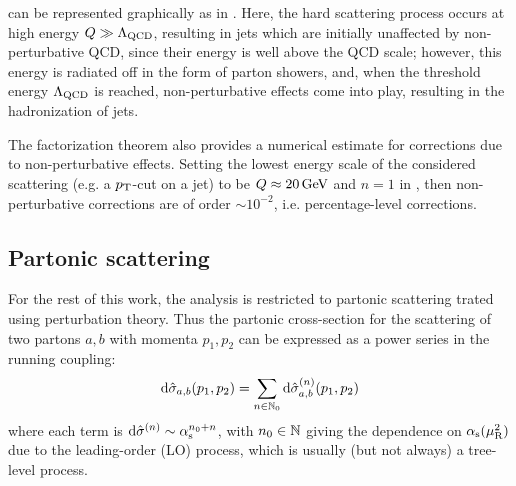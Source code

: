  can be represented graphically as in . Here, the hard scattering process occurs at high energy $ Q \gg \Lambda_\text{QCD} $, resulting in jets which are initially unaffected by non-perturbative QCD, since their energy is well above the QCD scale; however, this energy is radiated off in the form of parton showers, and, when the threshold energy $ \Lambda_\text{QCD} $ is reached, non-perturbative effects come into play, resulting in the hadronization of jets.

The factorization theorem also provides a numerical estimate for corrections due to non-perturbative effects. Setting the lowest energy scale of the considered scattering (e.g. a $ p_\text{T} $-cut on a jet) to be $ Q \approx 20\,\mathrm{GeV} $ and $ n = 1 $ in , then non-perturbative corrections are of order $ \sim 10^{-2} $, i.e. percentage-level corrections.

\subsection{Partonic scattering}

For the rest of this work, the analysis is restricted to partonic scattering trated using perturbation theory. Thus the partonic cross-section for the scattering of two partons $ a , b $ with momenta $ p_1 , p_2 $ can be expressed as a power series in the running coupling:
\begin{equation}
  \mathrm{d}\hat{\sigma}_{a,b}(p_1 , p_2) = \sum_{n \in \mathbb{N}_0} \mathrm{d}\hat{\sigma}_{a,b}^{(n)}(p_1 , p_2)
  \label{eq:part-ser-exp}
\end{equation}
where each term is $ \mathrm{d}\hat{\sigma}^{(n)} \sim \alpha_\text{s}^{n_0 + n} $, with $ n_0 \in \mathbb{N} $ giving the dependence on $ \alpha_\text{s}(\mu_\text{R}^2) $ due to the leading-order (LO) process, which is usually (but not always) a tree-level process.

